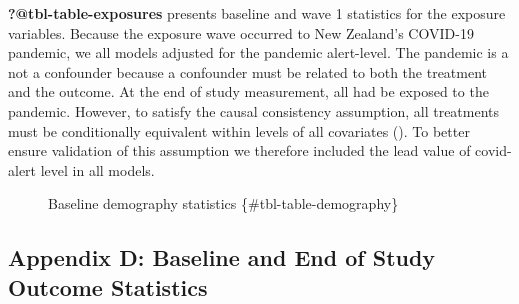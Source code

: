 \documentclass[
  singlecolumn]{article}
\begin{document}
\begin{description}
\item[\textbf{?@tbl-table-exposures} presents baseline and wave 1
statistics for the exposure variables. Because the exposure wave
occurred to New Zealand's COVID-19 pandemic, we all models adjusted for
the pandemic alert-level. The pandemic is a not a confounder because a
confounder must be related to both the treatment and the outcome. At the
end of study measurement, all had be exposed to the pandemic. However,
to satisfy the causal consistency assumption, all treatments must be
conditionally equivalent within levels of all covariates
(). To better
ensure validation of this assumption we therefore included the lead
value of covid-alert level in all models.]
Baseline demography statistics \{\#tbl-table-demography\}
\end{description}

\subsection{Appendix D: Baseline and End of Study Outcome
Statistics}\label{appendix-outcomes}
\end{document}
